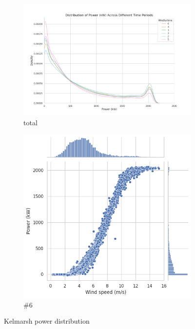 \documentclass{article}
\begin{document}
\begin{figure}[h!]
    \centering
    \begin{subfigure}[b]{0.45\linewidth}
        \centering
        \includegraphics[width=\linewidth]{graphs/data/Kelmarsh_output_distribution.png}
        \caption{total}
    \end{subfigure}
    \begin{subfigure}[b]{0.45\linewidth}
        \centering
        \includegraphics[width=\linewidth]{graphs/data/Corr_Wind_Power.png}
        \caption{\#6}
    \end{subfigure}
    \caption{Kelmarsh power distribution}
    \label{fig:Kelmarsh-distribution}
\end{figure}
\end{document}

